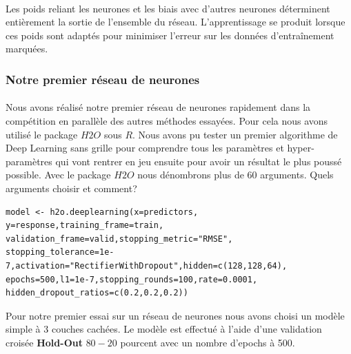 \documentclass[14pt, openany]{article}
\begin{document}
\paragraph{}
Les poids reliant les neurones et les biais avec d'autres neurones déterminent entièrement la sortie de l'ensemble du réseau. L'apprentissage se produit lorsque ces poids sont adaptés pour minimiser l'erreur sur les données d'entraînement marquées.

\subsubsection{Notre premier réseau de neurones}

\paragraph{}
Nous avons réalisé notre premier réseau de neurones rapidement dans la compétition en parallèle des autres méthodes essayées. Pour cela nous avons utilisé le package $H2O$ sous $R$. Nous avons pu tester un premier algorithme de Deep Learning sans grille pour comprendre tous les paramètres et hyper-paramètres qui vont rentrer en jeu ensuite pour avoir un résultat le plus poussé possible. Avec le package $H2O$ nous dénombrons plus de $60$ arguments. Quels arguments choisir et comment?

\begin{verbatim}
model <- h2o.deeplearning(x=predictors, y=response,training_frame=train,
validation_frame=valid,stopping_metric="RMSE",
stopping_tolerance=1e-7,activation="RectifierWithDropout",hidden=c(128,128,64), 
epochs=500,l1=1e-7,stopping_rounds=100,rate=0.0001,
hidden_dropout_ratios=c(0.2,0.2,0.2))
\end{verbatim}

Pour notre premier essai sur un réseau de neurones nous avons choisi un modèle simple à 3 couches cachées. Le modèle est effectué à l'aide d'une validation croisée \textbf{Hold-Out}  $80-20$ pourcent avec un nombre d'epochs à 500.
\end{document}
